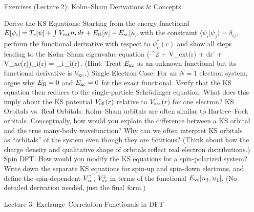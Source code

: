 Exercises (Lecture 2): Kohn–Sham Derivations & Concepts

Derive the KS Equations: Starting from the energy functional $E[{\psi_i}] = T_s[{\psi}] + \int V_{\rm ext} n,dr + E_{\rm H}[n] + E_{\rm xc}[n]$ with the constraint $\langle \psi_i|\psi_j\rangle = \delta_{ij}$, perform the functional derivative with respect to $\psi_i^*(r)$ and show all steps leading to the Kohn–Sham eigenvalue equation \Big(-\nabla^2 + V_{\rm ext}(r) + \int {}dr’ + V_{\rm xc}(r)\Big)\psi_i(r) = \epsilon_i\,\psi_i(r)\,. (Hint: Treat $E_{\rm xc}$ as an unknown functional but its functional derivative is $V_{\rm xc}$.)
Single Electron Case: For an $N=1$ electron system, argue why $E_{\rm H}=0$ and $E_{\rm xc}=0$ for the exact functional. Verify that the KS equation then reduces to the single-particle Schrödinger equation. What does this imply about the KS potential $V_{\rm eff}(r)$ relative to $V_{\rm ext}(r)$ for one electron?
KS Orbitals vs. Real Orbitals: Kohn–Sham orbitals are often similar to Hartree–Fock orbitals. Conceptually, how would you explain the difference between a KS orbital and the true many-body wavefunction? Why can we often interpret KS orbitals as “orbitals” of the system even though they are fictitious? (Think about how the charge density and qualitative shape of orbitals reflect real electron distributions.)
Spin DFT: How would you modify the KS equations for a spin-polarized system? Write down the separate KS equations for spin-up and spin-down electrons, and define the spin-dependent $V_{\rm xc}^\uparrow$, $V_{\rm xc}^\downarrow$ in terms of the functional $E_{\rm xc}[n_\uparrow, n_\downarrow]$. (No detailed derivation needed, just the final form.)





Lecture 3: Exchange–Correlation Functionals in DFT


